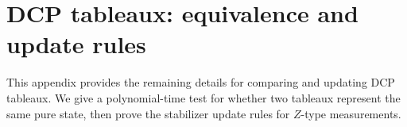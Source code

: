 \section{DCP tableaux: equivalence and update rules}
\label{appendix:dcp-tableaux}

This appendix provides the remaining details for comparing and updating DCP tableaux.
We give a polynomial-time test for whether two tableaux represent the same pure state, then prove the stabilizer update rules for $Z$-type measurements.




